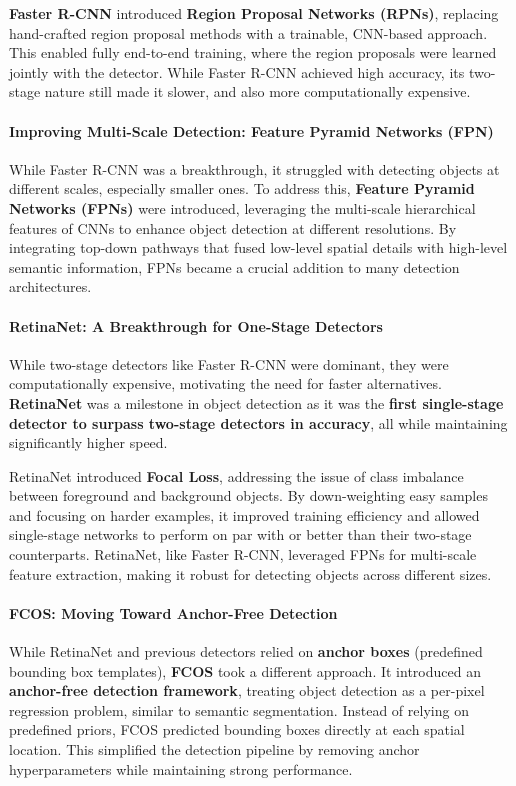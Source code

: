 \textbf{Faster R-CNN} introduced \textbf{Region Proposal Networks (RPNs)}, replacing hand-crafted region proposal methods with a trainable, CNN-based approach. This enabled fully end-to-end training, where the region proposals were learned jointly with the detector. While Faster R-CNN achieved high accuracy, its two-stage nature still made it slower, and also more computationally expensive.

\paragraph{Improving Multi-Scale Detection: Feature Pyramid Networks (FPN)}
While Faster R-CNN was a breakthrough, it struggled with detecting objects at different scales, especially smaller ones. To address this, \textbf{Feature Pyramid Networks (FPNs)} were introduced, leveraging the multi-scale hierarchical features of CNNs to enhance object detection at different resolutions. By integrating top-down pathways that fused low-level spatial details with high-level semantic information, FPNs became a crucial addition to many detection architectures.

\paragraph{RetinaNet: A Breakthrough for One-Stage Detectors}
While two-stage detectors like Faster R-CNN were dominant, they were computationally expensive, motivating the need for faster alternatives. \textbf{RetinaNet} was a milestone in object detection as it was the \textbf{first single-stage detector to surpass two-stage detectors in accuracy}, all while maintaining significantly higher speed.

RetinaNet introduced \textbf{Focal Loss}, addressing the issue of class imbalance between foreground and background objects. By down-weighting easy samples and focusing on harder examples, it improved training efficiency and allowed single-stage networks to perform on par with or better than their two-stage counterparts. RetinaNet, like Faster R-CNN, leveraged FPNs for multi-scale feature extraction, making it robust for detecting objects across different sizes.

\paragraph{FCOS: Moving Toward Anchor-Free Detection}
While RetinaNet and previous detectors relied on \textbf{anchor boxes} (predefined bounding box templates), \textbf{FCOS} took a different approach. It introduced an \textbf{anchor-free detection framework}, treating object detection as a per-pixel regression problem, similar to semantic segmentation. Instead of relying on predefined priors, FCOS predicted bounding boxes directly at each spatial location. This simplified the detection pipeline by removing anchor hyperparameters while maintaining strong performance.

